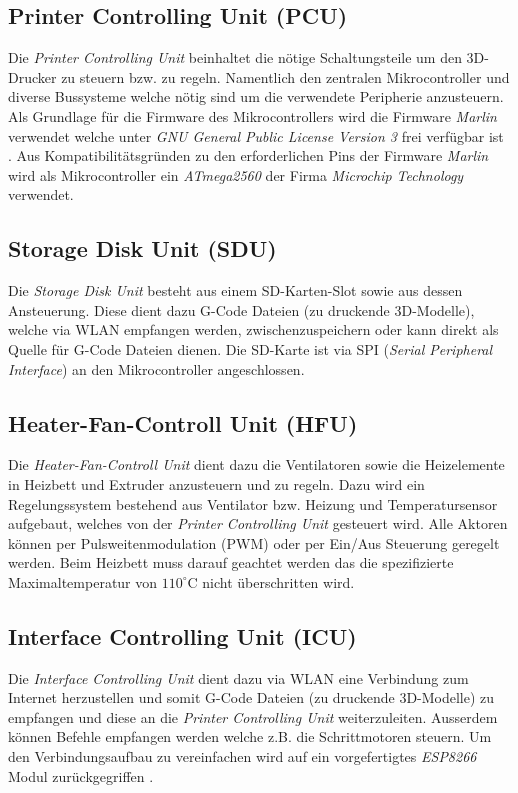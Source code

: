 \subsection{Printer Controlling Unit (PCU)}\label{subsec:PCU}
Die \textit{Printer Controlling Unit} beinhaltet die nötige Schaltungsteile um den 3D-Drucker zu steuern bzw. zu regeln. Namentlich den zentralen Mikrocontroller und diverse Bussysteme welche nötig sind um die verwendete Peripherie anzusteuern. Als Grundlage für die Firmware des Mikrocontrollers wird die Firmware \textit{Marlin} verwendet \cite{marlin_webseite} welche unter \textit{GNU General Public License Version 3} frei verfügbar ist \cite{marlin_gnu_lizenz}. Aus Kompatibilitätsgründen zu den erforderlichen Pins der Firmware \textit{Marlin} wird als Mikrocontroller ein \textit{ATmega2560} \cite{ATmega2560_spezifiaktion} der Firma \textit{Microchip Technology} verwendet.

\subsection{Storage Disk Unit (SDU)}\label{subsec:SDU}
Die \textit{Storage Disk Unit} besteht aus einem SD-Karten-Slot sowie aus dessen Ansteuerung. Diese dient dazu G-Code Dateien (zu druckende 3D-Modelle), welche via WLAN empfangen werden, zwischenzuspeichern oder kann direkt als Quelle für G-Code Dateien dienen. Die SD-Karte ist via SPI (\textit{Serial Peripheral Interface}) an den Mikrocontroller angeschlossen. 

\subsection{Heater-Fan-Controll Unit (HFU)}\label{subsec:HFU}
Die \textit{Heater-Fan-Controll Unit} dient dazu die Ventilatoren sowie die Heizelemente in Heizbett und Extruder anzusteuern und zu regeln. Dazu wird ein Regelungssystem bestehend aus Ventilator bzw. Heizung und Temperatursensor aufgebaut, welches von der \textit{Printer Controlling Unit} gesteuert wird. Alle Aktoren können per Pulsweitenmodulation (PWM) oder per Ein/Aus Steuerung geregelt werden. Beim Heizbett muss darauf geachtet werden das die spezifizierte Maximaltemperatur von $110^\circ$C \cite{ender3_spezifiaktion} nicht überschritten wird.

\subsection{Interface Controlling Unit (ICU)}\label{subsec:ICU}
Die \textit{Interface Controlling Unit} dient dazu via WLAN eine Verbindung zum Internet herzustellen und somit G-Code Dateien (zu druckende 3D-Modelle) zu empfangen und diese an die \textit{Printer Controlling Unit} weiterzuleiten. Ausserdem können Befehle empfangen werden welche z.B. die Schrittmotoren steuern. Um den Verbindungsaufbau zu vereinfachen wird auf ein vorgefertigtes \textit{ESP8266} Modul zurückgegriffen \cite{ESP8266_spezifiaktion}.


